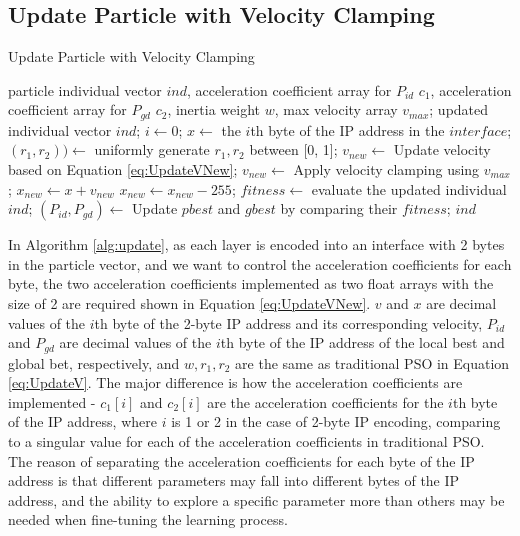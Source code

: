 \documentclass[conference]{IEEEtran}
\begin{document}
\subsection{Update Particle with Velocity Clamping}
\begin{algorithm}
	\caption{Update Particle with Velocity Clamping}
	\label{alg:update}
	\begin{algorithmic}
		\renewcommand{\algorithmicrequire}{\textbf{Input:}}
		\renewcommand{\algorithmicensure}{\textbf{Output:}}
		\REQUIRE particle individual vector $ind$, acceleration coefficient array for $P_{id}$ $c_{1}$, acceleration coefficient array for $P_{gd}$ $c_{2}$, inertia weight $w$, max velocity array $v_{max}$;
		\ENSURE updated individual vector $ind$;
			\STATE $i \leftarrow 0$;
				\STATE $x \leftarrow$ the $i$th byte of the IP address in the $interface$;
				\STATE $(r_{1}, r_{2})) \leftarrow$ uniformly generate $r_{1}, r_{2}$ between [0, 1];
				\STATE $v_{new} \leftarrow$ Update velocity based on Equation \ref{eq:UpdateVNew};
				\STATE $v_{new} \leftarrow$ Apply velocity clamping using $v_{max}$;
				\STATE $x_{new} \leftarrow x + v_{new}$
					\STATE $x_{new} \leftarrow x_{new}-255$;
				\ENDIF
			\ENDFOR
		\ENDFOR
		\STATE $fitness \leftarrow$ evaluate the updated individual $ind$;
		\STATE $(P_{id}, P_{gd}) \leftarrow$ Update $pbest$ and $gbest$ by comparing their $fitness$;
		\RETURN $ind$
	\end{algorithmic}
\end{algorithm}


In Algorithm \ref{alg:update}, as each layer is encoded into an interface with 2 bytes in the particle vector, and we want to control the acceleration coefficients for each byte, the two acceleration coefficients implemented as two float arrays with the size of 2 are required shown in Equation \ref{eq:UpdateVNew}. $v$ and $x$ are decimal values of the $i$th byte of the 2-byte IP address and its corresponding velocity, $P_{id}$ and $P_{gd}$ are decimal values of the $i$th byte of the IP address of the local best and global bet, respectively, and $w, r_{1}, r_{2}$ are the same as traditional PSO in Equation \ref{eq:UpdateV}. The major difference is how the acceleration coefficients are implemented - $c_{1}[i]$ and $c_{2}[i]$ are the acceleration coefficients for the $i$th byte of the IP address, where $i$ is 1 or 2 in the case of 2-byte IP encoding, comparing to a singular value for each of the acceleration coefficients in traditional PSO. The reason of separating the acceleration coefficients for each byte of the IP address is that different parameters may fall into different bytes of the IP address, and the ability to explore a specific parameter more than others may be needed when fine-tuning the learning process.
\end{document}
